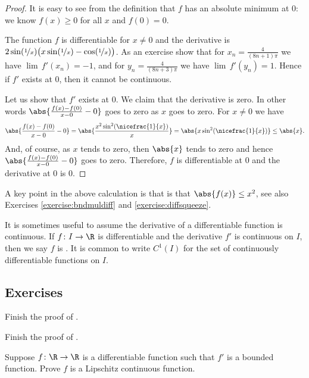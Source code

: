 \documentclass[12pt]{book}
\begin{document}
\begin{example}
\begin{proof}It is easy to see from the definition that $f$ has an absolute
minimum at 0: we know $f(x) \geq 0$ for all $x$ and $f(0) = 0$.

The function $f$ is differentiable for $x\not=0$
and
the derivative 
is $2 \sin (\nicefrac{1}{x}) \bigl( x \sin (\nicefrac{1}{x}) -
\cos(\nicefrac{1}{x}) \bigr)$.
As an exercise show that for $x_n = \frac{4}{(8n+1)\pi}$
we have
$\lim\, f'(x_n) = -1$, and for
$y_n = \frac{4}{(8n+3)\pi}$  we have
$\lim\, f'(y_n) = 1$.
Hence if $f'$ exists at $0$,
then it cannot be continuous.

Let us show that $f'$ exists at 0.
We claim that the derivative is zero.
In other words $\abs{\frac{f(x)-f(0)}{x-0} - 0}$ goes to zero
as $x$ goes to zero.
For $x \not= 0$ we have
\begin{equation*}
\abs{\frac{f(x)-f(0)}{x-0} - 0}
=
\abs{\frac{x^2 \sin^2(\nicefrac{1}{x})}{x}}
=
\abs{x \sin^2(\nicefrac{1}{x})}
\leq
\abs{x} .
\end{equation*}
And, of course, as $x$ tends to zero, then $\abs{x}$ tends to zero and hence
$\abs{\frac{f(x)-f(0)}{x-0} - 0}$ goes to zero.
Therefore, $f$
is differentiable at 0 and the derivative at 0 is 0.
\end{proof}

A key point in the above calculation is that 
is that $\abs{f(x)} \leq x^2$,
see also Exercises \ref{exercise:bndmuldiff} and
\ref{exercise:diffsqueeze}.
\end{example}

It is sometimes useful to assume the derivative of a differentiable
function is continuous.
If $f \colon I \to \R$ is differentiable and
the derivative $f'$ is continuous on $I$, then we say $f$ is
\emph{}.
It is common to
write $C^1(I)$ for the set of continuously differentiable functions on $I$.

\subsection*{Exercises}

\begin{exercise}
Finish the proof of .
\end{exercise}

\begin{exercise}
Finish the proof of .
\end{exercise}

\begin{exercise}
Suppose $f \colon \R \to \R$ is a differentiable
function such that $f'$ is a bounded function.
Prove
$f$ is a Lipschitz continuous function.
\end{exercise}
\end{document}
